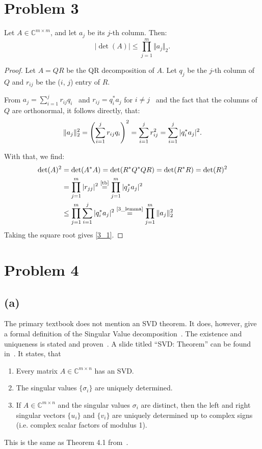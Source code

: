 \documentclass[a4paper, 11pt]{article}
\begin{document}
\section*{Problem 3}
Let $A \in \mathbb{C}^{m \times m}$, and let $a_j$ be its $j$-th column. Then:
\begin{equation}
  \vert \det(A) \vert \leq \prod_{j = 1}^m \Vert a_j\Vert_2.
  \label{3_1}
\end{equation}
\begin{proof}
  Let $A = QR$ be the QR decomposition of $A$. Let $q_j$ be the $j$-th
  column of $Q$ and $r_{ij}$ be the ($i$, $j$) entry of $R$.

  From $a_j = \sum_{i=1}^j r_{ij}q_i$~\cite[(7.3)]{tb}
  and $r_{ij} = q_i^*a_j$ for $i \neq j$~\cite[(7.7)]{tb} and the fact that the
  columns of $Q$ are orthonormal, it follows directly, that:
  \begin{equation}
  \Vert a_j \Vert_2^2 = \left(\sum_{i=1}^j r_{ij}q_i\right)^2 = \sum_{i=1}^j
  r_{ij}^2 = \sum_{i=1}^j \vert q_i^* a_j\vert^2.\\ \label{3_lemma}
  \end{equation}

  With that, we find:
  \begin{align*}
    \det(A)^2 &= \det(A^*A) = \det(R^*Q^*QR) = \det(R^*R) = \det(R)^2 \\
    &= \prod_{j = 1}^m \vert r_{jj}\vert^2 \stackrel{\text{\cite[(7.7)]{tb}}}{=}
    \prod_{j = 1}^m \vert q_j^*a_j\vert^2 \\
    &\leq \prod_{j = 1}^m \sum_{i = 1}^j \vert q_i^*a_j\vert^2 \stackrel{\text{\eqref{3_lemma}}}{=} \prod_{j = 1}^m \Vert a_j\Vert_2^2
  \end{align*}
  Taking the square root gives \eqref{3_1}.
\end{proof}

\section*{Problem 4}
\subsection*{(a)}
The primary textbook does not mention an SVD theorem. It
does, however, give a formal definition of the Singular Value
decomposition~\cite[pp. 28-29]{tb}. The existence and uniqueness is stated and
proven~\cite[Theorem 4.1]{tb}. A slide titled ``SVD: Theorem'' can be found
in~\cite{slides}. It states, that
\begin{enumerate}
  \item Every matrix $A \in \mathbb{C}^{m\times n}$ has an SVD.
  \item The singular values $\{\sigma_i\}$ are uniquely determined.
  \item If $A \in \mathbb{C}^{m\times n}$ and the singular values $\sigma_i$ are distinct, then the left and right singular vectors $\{u_i\}$ and $\{v_i\}$ are uniquely determined up to complex signs (i.e. complex scalar factors of modulus 1).
\end{enumerate}
This is the same as Theorem 4.1 from~\cite{tb}.
\end{document}
